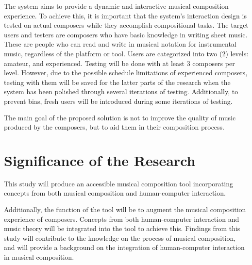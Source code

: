 The system aims to provide a dynamic and interactive musical composition experience. To achieve this, it is important that the system's interaction design is tested on actual composers while they accomplish compositional tasks. The target users and testers are composers who have basic knowledge in writing sheet music. These are people who can read and write in musical notation for instrumental music, regardless of the platform or tool. Users are categorized into two (2) levels: amateur, and experienced. Testing will be done with at least 3 composers per level. However, due to the possible schedule limitations of experienced composers, testing with them will be saved for the latter parts of the research when the system has been polished through several iterations of testing. Additionally, to prevent bias, fresh users will be introduced during some iterations of testing. 


The main goal of the proposed solution is not to improve the quality of music produced by the composers, but to aid them in their composition process. 

\section{Significance of the Research}
\label{sec:significance}


This study will produce an accessible musical composition tool incorporating concepts from both musical composition and human-computer interaction. 

Additionally, the function of the tool will be to augment the musical composition experience of composers. Concepts from both human-computer interaction and music theory will be integrated into the tool to achieve this. Findings from this study will contribute to the knowledge on the process of musical composition, and will provide a background on the integration of human-computer interaction in musical composition.


